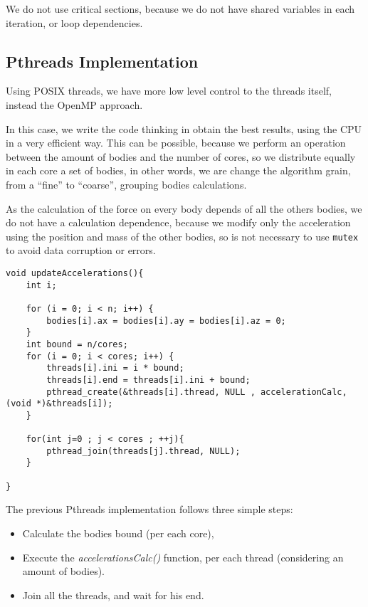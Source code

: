 We do not use critical sections,
because we do not have shared variables
in each iteration, or loop dependencies.

\subsection{Pthreads Implementation}

Using POSIX threads, we have more low level control
to the threads itself, instead the OpenMP approach.

In this case, we write the code thinking in obtain
the best results, using the CPU in a very efficient way.
This can be possible, because we perform an operation
between the amount of bodies and the number of cores,
so we distribute equally in each core a set of bodies,
in other words, we are change the algorithm grain,
from a ``fine'' to ``coarse'', grouping bodies
calculations.

As the calculation of the force on every body
depends of all the others bodies, we do not have
a calculation dependence, because we modify only the acceleration
using the position and mass of the other bodies,
so is not necessary to use \texttt{mutex} to avoid
data corruption or errors.

\begin{lstlisting}[style=C]
void updateAccelerations(){
    int i;

    for (i = 0; i < n; i++) {
        bodies[i].ax = bodies[i].ay = bodies[i].az = 0;
    }
    int bound = n/cores;
    for (i = 0; i < cores; i++) {
        threads[i].ini = i * bound;
        threads[i].end = threads[i].ini + bound;
        pthread_create(&threads[i].thread, NULL , accelerationCalc, (void *)&threads[i]);
    }

    for(int j=0 ; j < cores ; ++j){
        pthread_join(threads[j].thread, NULL);
    }

}
\end{lstlisting}

The previous Pthreads implementation follows three simple steps:

\begin{itemize}
    \item Calculate the bodies bound (per each core),
    \item Execute the \emph{accelerationsCalc()} function, per each thread (considering an amount of bodies).
    \item Join all the threads, and wait for his end.
\end{itemize}

